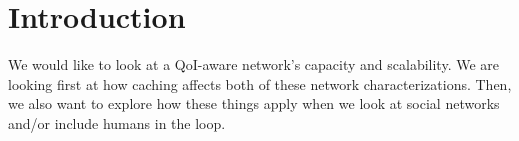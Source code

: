 \section{Introduction}
\label{sec:intro}

We would like to look at a QoI-aware network's capacity and scalability.  We are looking first at how caching affects both of these network characterizations.  Then, we also want to explore how these things apply when we look at social networks and/or include humans in the loop.


